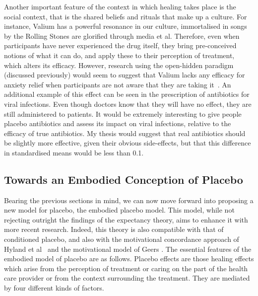 Another important feature of the context in which healing takes place is the social context, that is the shared beliefs and rituals that make up a culture. For instance, Valium has a powerful resonance in our culture, immortalised in songs by the Rolling Stones are glorified through media et al. Therefore, even when participants have never experienced the drug itself, they bring pre-conceived notions of what it can do, and apply these to their perception of treatment, which alters its efficacy. However, research using the open-hidden paradigm (discussed previously) would seem to suggest that Valium lacks any efficacy for anxiety relief when participants are not aware that they are taking it~\cite{benedetti2003}. An additional example of this effect can be seen in the prescription of antibiotics for viral infections. Even though doctors know that they will have no effect, they are still administered to patients. It would be extremely interesting to give people placebo antibiotics and assess its impact on viral infections, relative to the efficacy of true antibiotics. My thesis would suggest that real antibiotics should be slightly more effective, given their obvious side-effects, but that this difference in standardised means would be less than 0.1. 


\subsection{Towards an Embodied Conception of Placebo}
\label{sec:towards-an-embodied}
Bearing the previous sections in mind, we can now move forward into proposing a new model for placebo, the embodied placebo model. This model, while not rejecting outright the findings of the expectancy theory, aims to enhance it with more recent research. Indeed, this theory is also compatible with that of conditioned placebo, and also with the motivational concordance approach of Hyland et al~\cite{Hyland2007} and the motivational model of Geers \cite{Geers2005}.
The essential features of the embodied model of placebo are as follows. Placebo effects are those healing effects which arise from the perception of treatment or caring on the part of the health care provider or from the context surrounding the treatment. They are mediated by four different kinds of factors.



